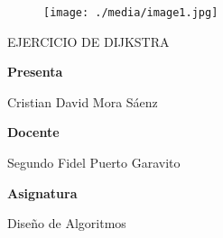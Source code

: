 \documentclass[12pt]{article}
\renewcommand{\_}{\kern-1.5pt\textunderscore\kern-1.5pt}
\begin{document}

\begin{figure}[H]
	\begin{Center}
		\texttt{[image: ./media/image1.jpg]}
	\end{Center}
\end{figure}



\par

\begin{Center}
EJERCICIO DE DIJKSTRA
\end{Center}\par


\vspace{\baselineskip}
\begin{Center}
\textbf{Presenta}
\end{Center}\par

\begin{Center}
Cristian David Mora Sáenz
\end{Center}\par

\begin{Center}
 
\end{Center}\par


\vspace{\baselineskip}
\begin{Center}
\textbf{Docente }
\end{Center}\par

\begin{Center}
Segundo Fidel Puerto Garavito
\end{Center}\par

\begin{Center}
 
\end{Center}\par


\vspace{\baselineskip}
\begin{Center}
\textbf{Asignatura}
\end{Center}\par

\begin{Center}
Diseño de Algoritmos
\end{Center}\par
\end{document}
